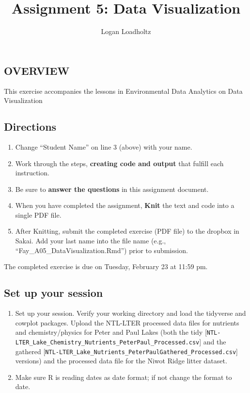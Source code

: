 \documentclass[
]{article}
\title{Assignment 5: Data Visualization}
\author{Logan Loadholtz}
\date{}
\providecommand{\tightlist}{%
  \setlength{\itemsep}{0pt}\setlength{\parskip}{0pt}}
\begin{document}
\maketitle

\hypertarget{overview}{%
\subsection{OVERVIEW}\label{overview}}

This exercise accompanies the lessons in Environmental Data Analytics on
Data Visualization

\hypertarget{directions}{%
\subsection{Directions}\label{directions}}

\begin{enumerate}
\def\labelenumi{\arabic{enumi}.}
\tightlist
\item
  Change ``Student Name'' on line 3 (above) with your name.
\item
  Work through the steps, \textbf{creating code and output} that fulfill
  each instruction.
\item
  Be sure to \textbf{answer the questions} in this assignment document.
\item
  When you have completed the assignment, \textbf{Knit} the text and
  code into a single PDF file.
\item
  After Knitting, submit the completed exercise (PDF file) to the
  dropbox in Sakai. Add your last name into the file name (e.g.,
  ``Fay\_A05\_DataVisualization.Rmd'') prior to submission.
\end{enumerate}

The completed exercise is due on Tuesday, February 23 at 11:59 pm.

\hypertarget{set-up-your-session}{%
\subsection{Set up your session}\label{set-up-your-session}}

\begin{enumerate}
\def\labelenumi{\arabic{enumi}.}
\item
  Set up your session. Verify your working directory and load the
  tidyverse and cowplot packages. Upload the NTL-LTER processed data
  files for nutrients and chemistry/physics for Peter and Paul Lakes
  (both the tidy
  {[}\texttt{NTL-LTER\_Lake\_Chemistry\_Nutrients\_PeterPaul\_Processed.csv}{]}
  and the gathered
  {[}\texttt{NTL-LTER\_Lake\_Nutrients\_PeterPaulGathered\_Processed.csv}{]}
  versions) and the processed data file for the Niwot Ridge litter
  dataset.
\item
  Make sure R is reading dates as date format; if not change the format
  to date.
\end{enumerate}
\end{document}
